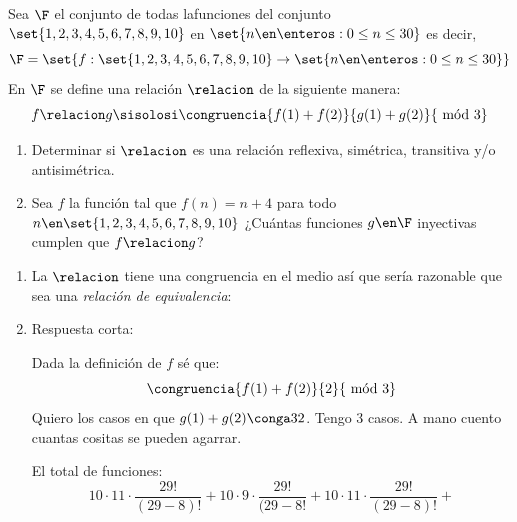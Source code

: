 \begin{enunciado}{\ejExtra[parcial 07/10/25]}

  Sea $\F$ el conjunto de todas lafunciones del conjunto $\set{1,2,3,4,5,6,7,8,9,10}$ en
  $\set{n \en \enteros : 0 \leq n \leq 30}$ es decir,
  $$
    \F = \set{f : \set{1,2,3,4,5,6,7,8,9,10} \to \set{n \en \enteros : 0 \leq n \leq 30} }
  $$
  En $\F$ se define una relación $\relacion$ de la siguiente manera:
  $$
    f \relacion g \sisolosi
    \congruencia{f(1) + f(2)}{g(1) + g(2)}{~\text{mód 3}}
  $$
  \begin{enumerate}[label=\alph*)]
    \item Determinar si $\relacion$ es una relación reflexiva, simétrica, transitiva y/o antisimétrica.

    \item Sea $f$ la función tal que $f(n) = n + 4$ para todo $n \en \set{1,2,3,4,5,6,7,8,9,10}$
          ¿Cuántas funciones $g \en \F$ inyectivas cumplen que $f \relacion g$?

  \end{enumerate}
\end{enunciado}

\begin{enumerate}[label=\alph*)]
  \item La $\relacion$ tiene una congruencia en el medio así que sería razonable que sea una \textit{relación de equivalencia}:
        \Hacer
  \item
        Respuesta corta: 

        Dada la definición de $f$ sé que:
        $$
          \congruencia{f(1) + f(2)}{2}{~\text{mód 3}}
        $$
        Quiero los casos en que $g(1) + g(2) \conga3 2$. Tengo 3 casos. A mano cuento cuantas cositas se pueden agarrar.

        El total de funciones:
        $$
          10 \cdot 11 \cdot \frac{29!}{(29-8)!} +
          10 \cdot 9 \cdot \frac{29!}{(29-8!} +
          10 \cdot 11 \cdot \frac{29!}{(29-8)!} +
        $$
\end{enumerate}
